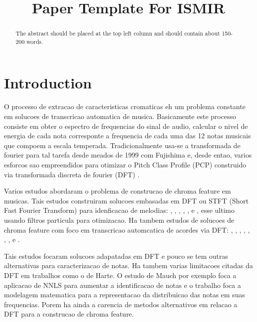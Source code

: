 \documentclass{article}
\title{Paper Template For ISMIR \conferenceyear}
\begin{document}
%
\maketitle
%
\begin{abstract}
The abstract should be placed at the top left column and should contain about 150-200 words.
\end{abstract}
%
\section{Introduction}\label{sec:introduction}


	O processo de extracao de caracteristicas cromaticas eh um problema constante em solucoes de transcricao automatica de musica. Basicamente este processo consiste em obter o espectro de frequencias do sinal de audio, calcular o nivel de energia de cada nota corresponte a frequencia de cada uma das 12 notas musicais que compoem a escala temperada. Tradicionalmente usa-se a transformada de fourier para tal tarefa desde meados de 1999 com Fujishima \cite{fujishima1999realtime} e, desde entao, varios esforcos sao empreendidos para otimizar o Pitch Class Profile (PCP) construido via transformada discreta de fourier (DFT) .

	Varios estudos abordaram o problema de construcao de chroma feature em musicas. Tais estudos construiram solucoes embasadas em DFT ou STFT (Short Fast Fourier Transform) para idenficacao de melodias: \cite{muto2002transcription}, \cite{al2008time}, \cite{barbancho2009transcription}, \cite{gomez2004automatic}, \cite{tangmelody}, \cite{eggink2004extracting} e \cite{jo2010melody}, esse ultimo usando filtros particula para otimizacao. Ha tambem estudos de solucoes de chroma feature com foco em transcricao automcatica de acordes via DFT:
	\cite{harte2009automatic}, \cite{khadkevich2011time}, \cite{harte2010towards}, \cite{peeters2006chroma}, \cite{cho2010exploring} \cite{lee2006automatic}, \cite{de2012improving}, \cite{boulanger2013audio}, \cite{chen2012chord} e \cite{hrybyk2010combined}.

	Tais estudos focaram solucoes adapatadas em DFT e pouco se tem outras alternativas para caracterizacao de notas. Ha tambem varias limitacoes citadas da DFT em trabalhos como o de Harte\cite{harte2010towards}. O estudo de Mauch\cite{mauch2010approximate} por exemplo foca a aplicacao de NNLS para aumentar a identificacao de notas e o trabalho \cite{wakefield1999mathematical} foca a modelagem matematica	para a representacao da distribuicao das notas em suas frequencias. Porem ha ainda a carencia de metodos alternativos em relacao a DFT para a construcao de chroma feature.
\end{document}
